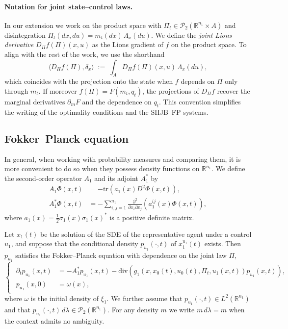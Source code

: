 \documentclass[12pt]{article}
\theoremstyle{definition}
\begin{document}
\paragraph{Notation for joint state--control laws.}
In our extension we work on the product space with $\Pi_t\in\mathcal{P}_2(\mathbb{R}^{n_1}\times A)$ and disintegration $\Pi_t(dx,du)=m_t(dx)\,\Lambda_x(du)$. We define the \emph{joint Lions derivative} $D_\Pi f(\Pi)(x,u)$ as the Lions gradient of $f$ on the product space. To align with the rest of the work, we use the shorthand
\[
\big\langle D_\Pi f(\Pi),\delta_x\big\rangle \;:=\; \int_A D_\Pi f(\Pi)(x,u)\,\Lambda_x(du),
\]
which coincides with the projection onto the state when $f$ depends on $\Pi$ only through $m_t$. If moreover $f(\Pi)=F(m_t,q_t)$, the projections of $D_\Pi f$ recover the marginal derivatives $\partial_m F$ and the dependence on $q_t$. This convention simplifies the writing of the optimality conditions and the SHJB--FP systems.

\subsection{Fokker--Planck equation}

In general, when working with probability measures and comparing them, it is more convenient to do so when they possess density functions on $\mathbb{R}^{n_1}$. We define the second-order operator $A_1$ and its adjoint $A_1^*$ by
\begin{equation}
    \begin{aligned}
    A_1\Phi(x,t) &= -\mathrm{tr}(a_1(x)D^2\Phi(x,t)), \\
    A_1^*\Phi(x,t) &= -\sum_{i,j=1}^{n_1}\frac{\partial^2}{\partial x_i \partial x_j}\left(a_1^{ij}(x)\Phi(x,t)\right),
    \end{aligned}
\end{equation}
where $a_1(x)=\frac{1}{2}\sigma_1(x)\sigma_1(x)^*$ is a positive definite matrix.

Let $x_1(t)$ be the solution of the SDE of the representative agent under a control $u_1$, and suppose that the conditional density $p_{u_1}(\cdot,t)$ of $x_1^{u_1}(t)$ exists. Then $p_{u_1}$ satisfies the Fokker--Planck equation with dependence on the joint law $\Pi$,
\begin{equation}
    \label{Fokker-Planck}
    \begin{cases}
        \begin{aligned}
            \partial_t p_{u_1}(x,t) &= -A_1^* p_{u_1}(x,t)
            - \mathrm{div}\!\left(g_1\!\left(x,x_0(t),u_0(t), \Pi_t,u_1(x,t)\right)p_{u_1}(x,t)\right),\\[0.2cm]
            p_{u_1}(x,0) &= \omega(x),
        \end{aligned}
    \end{cases}
\end{equation}
where $\omega$ is the initial density of $\xi_1$. We further assume that $p_{u_1}(\cdot,t)\in L^2(\mathbb{R}^{n_1})$ and that $p_{u_1}(\cdot,t)\,d\lambda \in \mathcal{P}_2(\mathbb{R}^{n_1})$. For any density $m$ we write $m\,d\lambda= m$ when the context admits no ambiguity.
\end{document}
